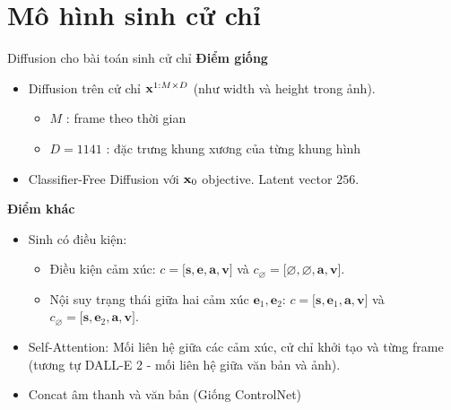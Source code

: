 
\section{Mô hình sinh cử chỉ}

\begin{frame}{Diffusion cho bài toán sinh cử chỉ}
	\textbf{Điểm giống}
	\begin{itemize}
		\item Diffusion \cite{yang2023diffusestylegesture} trên cử chỉ $\mathbf{x}^{1:M \times D}$ (như width và height trong ảnh).
		\begin{itemize}
			\item $M$ : frame theo thời gian
			\item $D=1141$ : đặc trưng khung xương của từng khung hình
		\end{itemize}
		\item Classifier-Free Diffusion với $\mathbf{x}_0$ objective. Latent vector $256$.
		\end{itemize}
		
		\pause
		\textbf{Điểm khác}
		
		\begin{itemize}
			\item Sinh có điều kiện:
			\begin{itemize}
				\item Điều kiện cảm xúc: $c = \big[ \mathbf{s}, \mathbf{e}, \mathbf{a}, \mathbf{v} \big]$ và $c_{\varnothing} = \big[ \varnothing, \varnothing, \mathbf{a}, \mathbf{v}\big]$.
				\item Nội suy trạng thái giữa hai cảm xúc $\mathbf{e}_1, \mathbf{e}_2$: $c = \big[ \mathbf{s}, \mathbf{e}_1, \mathbf{a}, \mathbf{v} \big]$ và $c_{\varnothing} = \big[ \mathbf{s}, \mathbf{e}_2, \mathbf{a}, \mathbf{v} \big]$.
			\end{itemize}
			\item Self-Attention: Mối liên hệ giữa các cảm xúc, cử chỉ khởi tạo và từng frame (tương tự DALL-E 2 - mối liên hệ giữa văn bản và ảnh).
			\item Concat âm thanh và văn bản (Giống ControlNet)
		\end{itemize}
\end{frame}



